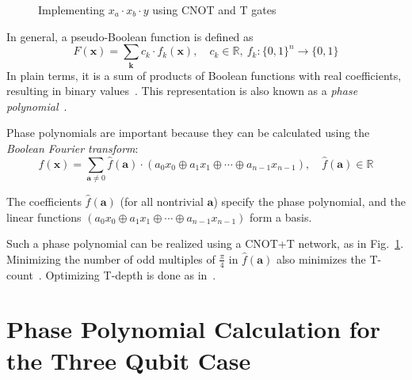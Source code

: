 \documentclass[a4paper]{article}
\begin{document}
\vspace{0.2cm}

\begin{figure}[t]
  \centering
  \scalebox{0.7} {
    
  }
  \caption{Implementing $x_a \cdot x_b \cdot y$ using CNOT and T gates}
  \label{fig-toff-mark}
\end{figure}

\vspace{0.3cm}

In general, a pseudo-Boolean function is defined as
\begin{equation}
  \label{eq-pseudo-boolean}
  F(\mathbf{x}) = \sum_{\mathbf{k}} c_k \cdot f_k(\mathbf{x}), \quad c_k \in \mathbb{R},\ f_k : \{0,1\}^n \to \{0,1\}
\end{equation}
In plain terms, it is a sum of products of Boolean functions with real coefficients, resulting in binary values~\cite{bib-barenco-elementary}. This representation is also known as a {\it phase polynomial}~\cite{bib-amy-cnot}.

\vspace{0.5cm}

Phase polynomials are important because they can be calculated using the {\it Boolean Fourier transform}:
\begin{equation}
  \label{eq-boolean-fourier}
  f(\mathbf{x}) = \sum_{\mathbf{a} \neq 0} \hat{f}(\mathbf{a}) \cdot ( a_0 x_0 \oplus a_1 x_1 \oplus \cdots \oplus a_{n-1} x_{n-1}), \quad \hat{f}(\mathbf{a}) \in \mathbb{R}
\end{equation}

\vspace{0.3cm}

The coefficients $\hat{f}(\mathbf{a})$ (for all nontrivial $\mathbf{a}$) specify the phase polynomial, and the linear functions $( a_0 x_0 \oplus a_1 x_1 \oplus \cdots \oplus a_{n-1} x_{n-1})$ form a basis.

Such a phase polynomial can be realized using a CNOT+T network, as in Fig.~\ref{fig-toff-mark}. Minimizing the number of odd multiples of $\frac{\pi}{4}$ in $\hat{f}(\mathbf{a})$ also minimizes the T-count~\cite{bib-amy-rm}. Optimizing T-depth is done as in~\cite{bib-amy-matroid}.

\vspace{0.4cm}

\section{Phase Polynomial Calculation for the Three Qubit Case}
\label{Chap:Bool-pbool3q}
\end{document}
